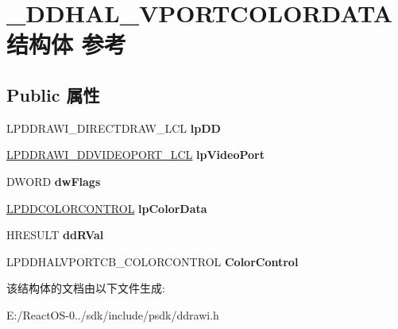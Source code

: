\hypertarget{struct___d_d_h_a_l___v_p_o_r_t_c_o_l_o_r_d_a_t_a}{}\section{\+\_\+\+D\+D\+H\+A\+L\+\_\+\+V\+P\+O\+R\+T\+C\+O\+L\+O\+R\+D\+A\+T\+A结构体 参考}
\label{struct___d_d_h_a_l___v_p_o_r_t_c_o_l_o_r_d_a_t_a}
\subsection*{Public 属性}
\begin{DoxyCompactItemize}
\item 
\mbox{\label{struct___d_d_h_a_l___v_p_o_r_t_c_o_l_o_r_d_a_t_a_a85cda8ac72b05ff9b9af4039c1a8ba63}} 
L\+P\+D\+D\+R\+A\+W\+I\+\_\+\+D\+I\+R\+E\+C\+T\+D\+R\+A\+W\+\_\+\+L\+CL {\bfseries lp\+DD}
\item 
\mbox{\label{struct___d_d_h_a_l___v_p_o_r_t_c_o_l_o_r_d_a_t_a_a747bafa595c2ec76738d14d53abcb803}} 
\hyperlink{struct___d_d_r_a_w_i___d_d_v_i_d_e_o_p_o_r_t___l_c_l}{L\+P\+D\+D\+R\+A\+W\+I\+\_\+\+D\+D\+V\+I\+D\+E\+O\+P\+O\+R\+T\+\_\+\+L\+CL} {\bfseries lp\+Video\+Port}
\item 
\mbox{\label{struct___d_d_h_a_l___v_p_o_r_t_c_o_l_o_r_d_a_t_a_abc5da6b65c357d794b241c4cb02e73e7}} 
D\+W\+O\+RD {\bfseries dw\+Flags}
\item 
\mbox{\label{struct___d_d_h_a_l___v_p_o_r_t_c_o_l_o_r_d_a_t_a_a2d46e2eb873dcbe7ef47fdbb3d33f0cb}} 
\hyperlink{struct___d_d_c_o_l_o_r_c_o_n_t_r_o_l}{L\+P\+D\+D\+C\+O\+L\+O\+R\+C\+O\+N\+T\+R\+OL} {\bfseries lp\+Color\+Data}
\item 
\mbox{\label{struct___d_d_h_a_l___v_p_o_r_t_c_o_l_o_r_d_a_t_a_a61afd0f0e5035007dab282beef1c554c}} 
H\+R\+E\+S\+U\+LT {\bfseries dd\+R\+Val}
\item 
\mbox{\label{struct___d_d_h_a_l___v_p_o_r_t_c_o_l_o_r_d_a_t_a_a6ddb307009efb0b1044e332bfa9b8967}} 
L\+P\+D\+D\+H\+A\+L\+V\+P\+O\+R\+T\+C\+B\+\_\+\+C\+O\+L\+O\+R\+C\+O\+N\+T\+R\+OL {\bfseries Color\+Control}
\end{DoxyCompactItemize}


该结构体的文档由以下文件生成\+:\begin{DoxyCompactItemize}
\item 
E\+:/\+React\+O\+S-\/0../sdk/include/psdk/ddrawi.\+h\end{DoxyCompactItemize}
